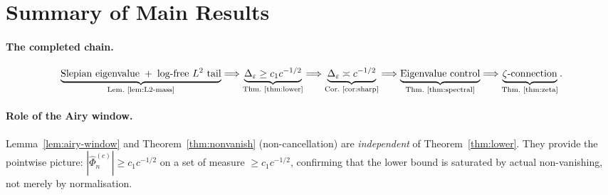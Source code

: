 \documentclass[12pt,a4paper]{amsart}
\theoremstyle{definition}
\theoremstyle{remark}
\newcommand{\Phihat}{\widehat{\Phi}}
\begin{document}
\section*{Summary of Main Results}

\paragraph{The completed chain.}
\[
  \underbrace{\text{Slepian eigenvalue}
    \;+\; \text{log-free }L^2\text{ tail}}_{%
    \text{Lem.~\ref{lem:L2-mass}}}
  \Longrightarrow
  \underbrace{\Delta_\varepsilon \ge c_1 c^{-1/2}}_{%
    \text{Thm.~\ref{thm:lower}}}
  \Longrightarrow
  \underbrace{\Delta_\varepsilon \asymp c^{-1/2}}_{%
    \text{Cor.~\ref{cor:sharp}}}
  \Longrightarrow
  \underbrace{\text{Eigenvalue control}}_{%
    \text{Thm.~\ref{thm:spectral}}}
  \Longrightarrow
  \underbrace{\zeta\text{-connection}}_{%
    \text{Thm.~\ref{thm:zeta}}}.
\]

\paragraph{Role of the Airy window.}
Lemma~\ref{lem:airy-window} and
Theorem~\ref{thm:nonvanish} (non-cancellation)
are \emph{independent} of Theorem~\ref{thm:lower}.
They provide the pointwise picture:
$|\Phihat_n^{(c)}|\ge c_1 c^{-1/2}$
on a set of measure $\ge c_1 c^{-1/2}$,
confirming that the lower bound is saturated
by actual non-vanishing, not merely by
normalisation.
\end{document}
